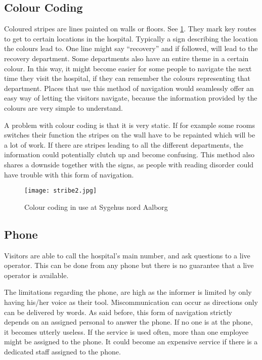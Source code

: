 \subsection{Colour Coding}\label{sub:col}
Coloured stripes are lines painted on walls or floors. See \cref{fig:colour_floor}. They mark key routes to get to certain locations in the hospital. Typically a sign describing the location the colours lead to. One line might say \enquote{recovery} and if followed, will lead to the recovery department. Some departments also have an entire theme in a certain colour. In this way, it might become easier for some people to navigate the next time they visit the hospital, if they can remember the colours representing that department.
Places that use this method of navigation would seamlessly offer an easy way of letting the visitors navigate, because the information provided by the colours are very simple to understand.

A problem with colour coding is that it is very static. If for example some rooms switches their function the stripes on the wall have to be repainted which will be a lot of work. If there are stripes leading to all the different departments, the information could potentially clutch up and become confusing. This method also shares a downside together with the signs, as people with reading disorder could have trouble with this form of navigation.

\begin{figure}[htb]
  \begin{center} 
    \texttt{[image: stribe2.jpg]}
  \end{center}
  \caption{Colour coding in use at Sygehus nord Aalborg}
  \label{fig:colour_floor}
\end{figure}




\subsection{Phone}\label{sub:pho}
Visitors are able to call the hospital's main number, and ask questions to a live operator. This can be done from any phone but there is no guarantee that a live operator is available. \cite{Vendsyssel}
 
The limitations regarding the phone, are high as the informer is limited by only having his/her voice as their tool. Miscommunication can occur as directions only can be delivered by words. As said before, this form of navigation strictly depends on an assigned personal to answer the phone. If no one is at the phone, it becomes utterly useless.
If the service is used often, more than one employee might be assigned to the phone. It could become an expensive service if there is a dedicated staff assigned to the phone.


